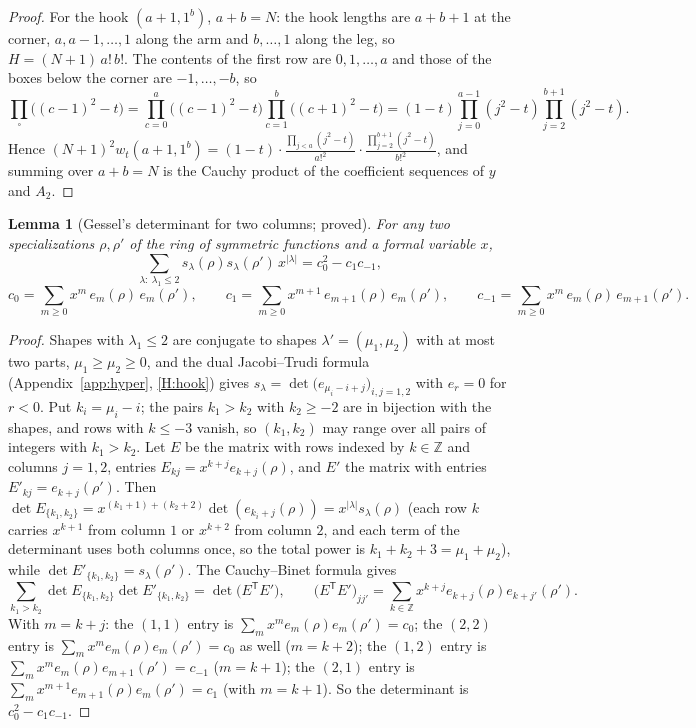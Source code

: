 \documentclass[11pt]{article}
\newtheorem{lemma}[theorem]{Lemma}
\theoremstyle{definition}
\theoremstyle{remark}
\newcommand{\Z}{\mathbb{Z}}
\begin{document}
\begin{proof}
For the hook $(a+1,1^b)$, $a+b=N$: the hook lengths are $a+b+1$ at the corner, $a,a-1,\dots,1$ along the arm and $b,\dots,1$ along the leg, so $H=(N+1)\,a!\,b!$. The contents of the first row are $0,1,\dots,a$ and those of the boxes below the corner are $-1,\dots,-b$, so
\[
\prod_\square\bigl((c-1)^2-t\bigr)=\prod_{c=0}^a\bigl((c-1)^2-t\bigr)\prod_{c=1}^{b}\bigl((c+1)^2-t\bigr)=(1-t)\prod_{j=0}^{a-1}(j^2-t)\prod_{j=2}^{b+1}(j^2-t).
\]
Hence $(N+1)^2w_t(a+1,1^b)=(1-t)\cdot\frac{\prod_{j<a}(j^2-t)}{a!^2}\cdot\frac{\prod_{j=2}^{b+1}(j^2-t)}{b!^2}$, and summing over $a+b=N$ is the Cauchy product of the coefficient sequences of $y$ and $A_2$.
\end{proof}

\begin{lemma}[Gessel's determinant for two columns; proved]\label{lem:gessel2}
For any two specializations $\rho,\rho'$ of the ring of symmetric functions and a formal variable $x$,
\begin{equation}\label{eq:gessel2}
\sum_{\lambda:\ \lambda_1\le2}s_\lambda(\rho)s_\lambda(\rho')\,x^{|\lambda|}=c_0^2-c_1c_{-1},
\end{equation}
\[
c_0=\sum_{m\ge0}x^m\,e_m(\rho)\,e_m(\rho'),\qquad
c_1=\sum_{m\ge0}x^{m+1}\,e_{m+1}(\rho)\,e_m(\rho'),\qquad
c_{-1}=\sum_{m\ge0}x^{m}\,e_m(\rho)\,e_{m+1}(\rho').
\]
\end{lemma}

\begin{proof}
Shapes with $\lambda_1\le2$ are conjugate to shapes $\lambda'=(\mu_1,\mu_2)$ with at most two parts, $\mu_1\ge\mu_2\ge0$, and the dual Jacobi--Trudi formula (Appendix~\ref{app:hyper}, \ref{H:hook}) gives $s_\lambda=\det\bigl(e_{\mu_i-i+j}\bigr)_{i,j=1,2}$ with $e_r=0$ for $r<0$. Put $k_i=\mu_i-i$; the pairs $k_1>k_2$ with $k_2\ge-2$ are in bijection with the shapes, and rows with $k\le-3$ vanish, so $(k_1,k_2)$ may range over all pairs of integers with $k_1>k_2$. Let $E$ be the matrix with rows indexed by $k\in\Z$ and columns $j=1,2$, entries $E_{kj}=x^{k+j}e_{k+j}(\rho)$, and $E'$ the matrix with entries $E'_{kj}=e_{k+j}(\rho')$. Then $\det E_{\{k_1,k_2\}}=x^{(k_1+1)+(k_2+2)}\det(e_{k_i+j}(\rho))=x^{|\lambda|}s_\lambda(\rho)$ (each row $k$ carries $x^{k+1}$ from column $1$ or $x^{k+2}$ from column $2$, and each term of the determinant uses both columns once, so the total power is $k_1+k_2+3=\mu_1+\mu_2$), while $\det E'_{\{k_1,k_2\}}=s_\lambda(\rho')$. The Cauchy--Binet formula gives
\[
\sum_{k_1>k_2}\det E_{\{k_1,k_2\}}\det E'_{\{k_1,k_2\}}=\det\bigl(E^{\mathsf T}E'\bigr),\qquad
\bigl(E^{\mathsf T}E'\bigr)_{jj'}=\sum_{k\in\Z}x^{k+j}e_{k+j}(\rho)e_{k+j'}(\rho').
\]
With $m=k+j$: the $(1,1)$ entry is $\sum_mx^me_m(\rho)e_m(\rho')=c_0$; the $(2,2)$ entry is $\sum_mx^{m}e_m(\rho)e_m(\rho')=c_0$ as well ($m=k+2$); the $(1,2)$ entry is $\sum_mx^me_m(\rho)e_{m+1}(\rho')=c_{-1}$ ($m=k+1$); the $(2,1)$ entry is $\sum_mx^{m+1}e_{m+1}(\rho)e_m(\rho')=c_1$ (with $m=k+1$). So the determinant is $c_0^2-c_1c_{-1}$.
\end{proof}
\end{document}
